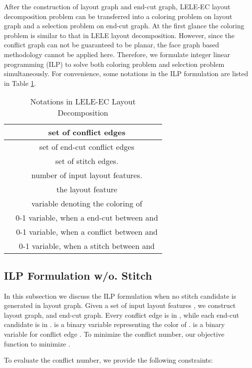 \documentclass[12pt]{spieman}
\theoremstyle{plain}
\begin{document}
\begin{spacing}{1}
After the construction of layout graph and end-cut graph, LELE-EC layout decomposition problem can be transferred into a coloring problem on layout graph and a selection problem on end-cut graph.
At the first glance the coloring problem is similar to that in LELE layout decomposition.
However, since the conflict graph can not be guaranteed to be planar, the face graph based methodology \cite{DPL_ISPD2010_Xu} cannot be applied here.
Therefore, we formulate integer linear programming (ILP) to solve both coloring problem and selection problem simultaneously.
For convenience, some notations in the ILP formulation are listed in Table \ref{tab:tplec_notation}.

\begin{table}[hbt]
\centering
\caption{Notations in LELE-EC Layout Decomposition}
\label{tab:tplec_notation}
\begin{tabular}{|c|c|}
	\hline
  \hline  		    & set of conflict edges\\
	\hline  		    & set of end-cut conflict edges\\
  \hline  		    & set of stitch edges.\\
	\hline           & number of input layout features. \\
  \hline  		    & the  layout feature\\
	\hline  		    & variable denoting the coloring of \\
	\hline     & 0-1 variable,  when a end-cut between  and \\
  \hline  	  & 0-1 variable,  when a conflict between  and \\
	\hline  	  & 0-1 variable,  when a stitch between  and \\
	\hline\hline
\end{tabular}
\end{table}


\subsection{ILP Formulation w/o. Stitch}
In this subsection we discuss the ILP formulation when no stitch candidate is generated in layout graph.
Given a set of input layout features , we construct layout graph, and end-cut graph.
Every conflict edge  is in , while each end-cut candidate  is in .
 is a binary variable representing the color of .
 is a binary variable for conflict edge .
To minimize the conflict number, our objective function to minimize .

To evaluate the conflict number, we provide the following constraints:


\end{spacing}
\end{document}
